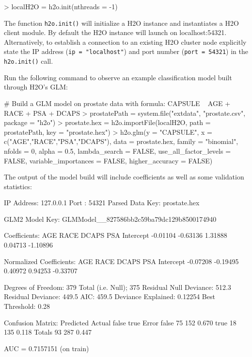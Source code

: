 \documentclass[11pt]{article}
\begin{document}
\begin{spverbatim}
> localH2O = h2o.init(nthreads = -1)

\end{spverbatim}
\noindent
The function \texttt{h2o.init()} will initialize a H2O instance and instantiates a H2O client module. By default the H2O instance will launch on localhost:54321. Alternatively, to establish a connection to an existing H2O cluster node explicitly state the IP address (\texttt{ip = "localhost"}) and port number (\texttt{port = 54321}) in the \texttt{h2o.init()} call.

\noindent
Run the following command to observe an example classification model built through H2O's GLM:

\begin{spverbatim}
# Build a GLM model on prostate data with formula: CAPSULE ~ AGE + RACE + PSA + DCAPS
> prostatePath = system.file("extdata", "prostate.csv", package = "h2o")
> prostate.hex = h2o.importFile(localH2O, path = prostatePath, key = "prostate.hex")
> h2o.glm(y = "CAPSULE", x = c("AGE","RACE","PSA","DCAPS"), data = prostate.hex, family = "binomial", nfolds = 0, alpha = 0.5, lambda_search = FALSE, use_all_factor_levels = FALSE, variable_importances = FALSE, higher_accuracy = FALSE)
\end{spverbatim}

\vspace{10 mm}
\noindent
The output of the model build will include coefficients as well as some validation statistics:

\begin{spverbatim}       
IP Address: 127.0.0.1 
Port      : 54321 
Parsed Data Key: prostate.hex 

GLM2 Model Key: GLMModel__827586bb2c59ba79dc129b8500174940

Coefficients:
      AGE      RACE     DCAPS       PSA Intercept 
 -0.01104  -0.63136   1.31888   0.04713  -1.10896 

Normalized Coefficients:
      AGE      RACE     DCAPS       PSA Intercept 
 -0.07208  -0.19495   0.40972   0.94253  -0.33707 

Degrees of Freedom: 379 Total (i.e. Null);  375 Residual
Null Deviance:     512.3
Residual Deviance: 449.5  AIC: 459.5
Deviance Explained: 0.12254 
 Best Threshold: 0.28

Confusion Matrix:
        Predicted
Actual   false true Error
  false     75  152 0.670
  true      18  135 0.118
  Totals    93  287 0.447

AUC =  0.7157151 (on train)
\end{spverbatim}
\end{document}
